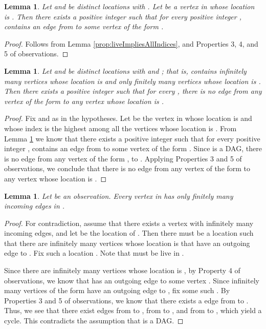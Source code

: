 \documentclass[11pt]{article}
\numberwithin{theorem}{section}
\newtheorem{lemma}[theorem]{Lemma}
\begin{document}
\begin{lemma}
\label{prop:outgoingEdgesToLiveVertices}
Let  and  be distinct locations with .
Let  be a vertex in  whose location is .
Then there exists a positive integer  such that for every positive
integer ,  contains an edge from  to some vertex of
the form .
\end{lemma}

\begin{proof}
Follows from Lemma \ref{prop:liveImpliesAllIndices}, and
Properties 3, 4, and 5 of observations.
\end{proof}




\begin{lemma}
\label{prop:outgoingEdgesToCrashedVertices}
Let  and  be distinct locations with  and ; that is,  contains infinitely many vertices whose
location is  and only finitely many vertices whose location is .
Then there exists a positive integer  such that for every , there is no edge from any vertex of the form  to any
vertex whose location is .
\end{lemma}

\begin{proof}
Fix  and  as in the hypotheses.
Let  be the vertex in  whose location is  and whose index
is the highest among all the vertices whose location is .
From Lemma \ref{prop:outgoingEdgesToLiveVertices} we know that
there exists a positive integer  such that for every positive
integer ,  contains an edge from  to some vertex of the
form . 
Since  is a DAG, there is no edge from any vertex of the form
,  to . 
Applying Properties 3 and 5 of observations, we conclude that
there is no edge from any vertex of the form  to any vertex
whose location is .
\end{proof}

\begin{lemma}
\label{prop:finiteIncomingEdges}
Let  be an observation.
Every vertex  in  has only finitely many incoming edges in .
\end{lemma}

\begin{proof}
For contradiction, assume that there exists a vertex  with
infinitely many incoming edges, and let  be the location of .
Then there must be a location  such that there are
infinitely many vertices whose location is  that have an outgoing
edge to .   
Fix such a location . 
Note that  must be live in .

Since there are infinitely many vertices whose location is , by
Property 4 of observations, we know that  has an outgoing edge to
some vertex . 
Since infinitely many vertices of the form
 have an outgoing edge to , fix some such . 
By Properties 3 and 5 of observations, we know that there exists a
edge from  to . 
Thus, we see that there exist edges from  to , 
from  to , and from  to , which yield a
cycle. 
This contradicts the assumption that  is a DAG. 
\end{proof}
\end{document}

